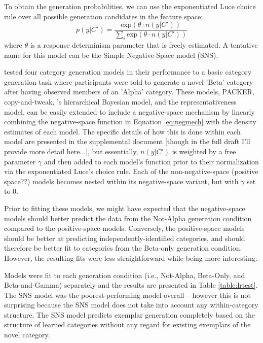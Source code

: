 \documentclass[12pt]{article}
\begin{document}
\begin{flushleft}
To obtain the generation probabilities, we can use the exponentiated Luce choice rule over all possible generation
candidates in the feature space: 
\begin{equation}\label{eq:negluce}
p(y|C') = \dfrac
{\textrm{exp}(\theta \cdot n(y|C'))}
{\sum_i \textrm{exp}(\theta \cdot n(y|C'))}
\end{equation}
where $\theta$ is a response determinism parameter that is freely estimated. A tentative name for this model can be the
Simple Negative-Space model (SNS).

\citet{austerweil2019catgen} tested four category generation models in their performance to a basic category generation
task where participants were told to generate a novel 'Beta' category after having observed members of an 'Alpha'
category. These models, PACKER, copy-and-tweak, \citet{jern2013probabilistic}'s hierarchical Bayesian model, and the
representativeness model, can be easily extended to include a negative-space mechanism by linearly combining the
negative-space function in Equation \ref{eq:negmech} with the density estimates of each model. The specific details of
how this is done within each model are presented in the supplemental document [though in the full draft I'll provide
more detail here...], but essentially, $n(y|C')$ is weighted by a free parameter $\gamma$ and then added to each model's
function prior to their normalization via the exponentiated Luce's choice rule. Each of the non-negative-space (positive
space??) models becomes nested within its negative-space variant, but with $\gamma$ set to 0.

Prior to fitting these models, we might have expected that the negative-space models should better predict the data from
the Not-Alpha generation condition compared to the positive-space models. Conversely, the positive-space models should
be better at predicting independently-identified categories, and should therefore be better fit to categories from the
Beta-only generation condition. However, the resulting fits were less straightforward while being more interesting.


Models were fit to each generation condition (i.e., Not-Alpha, Beta-Only, and Beta-and-Gamma) separately and the results
are presented in Table \ref{table:lrtest}. The SNS model was the poorest-performing model overall -- however this is not
surprising because the SNS model does not take into account any within-category structure. The SNS model predicts
exemplar generation completely based on the structure of learned categories without any regard for existing exemplars of
the novel category. 


\end{flushleft}
\end{document}
